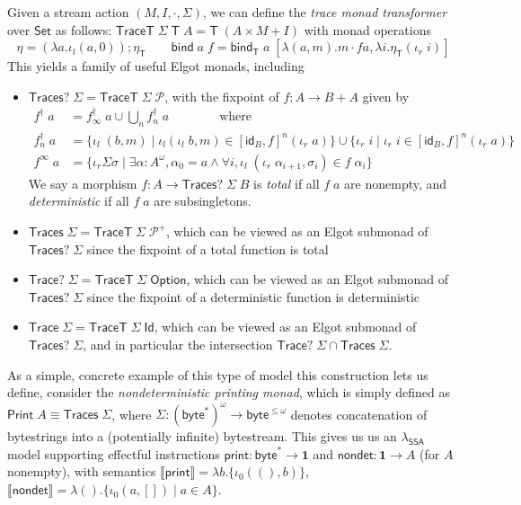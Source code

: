 \documentclass[acmsmall,screen,review]{acmart}
\newcommand{\mc}[1]{\ensuremath{\mathcal{#1}}}
\newcommand{\mb}[1]{\ensuremath{\mathbf{#1}}}
\newcommand{\ms}[1]{\ensuremath{\mathsf{#1}}}
\newcommand{\dnt}[1]{\llbracket{#1}\rrbracket}
\newcommand{\isotopessa}{\(\lambda_{\ms{SSA}}\)}
\begin{document}
\begin{definition}
  Given a stream action $(M, I, \cdot, \Sigma)$, we can define the \emph{trace monad transformer}
  over $\ms{Set}$ as follows:
  $
  \ms{TraceT}\;\Sigma\;\ms{T}\;A = \ms{T}\;(A \times M + I)
  $
  with monad operations
  $$
    \eta = (\lambda a. \iota_l (a, 0)) ; \eta_{\ms{T}} \qquad
    \ms{bind}\;a\;f 
    = \ms{bind}_{\ms{T}}\;a\;[\lambda (a, m). m \cdot f a, \lambda i. \eta_{\ms{T}}(\iota_r\;i)]
  $$
  This yields a family of useful Elgot monads, including
  \begin{itemize}
    \item $\ms{Traces}?\;\Sigma = \ms{TraceT}\;\Sigma\;\mc{P}$, with the fixpoint of 
    $f : A \to B + A$ given by
    \begin{align}
      f^\dagger\;a &= f^\dagger_\infty\;a \cup \bigcup_n f^\dagger_n\;a 
        \qquad \qquad \text{where} \\
      f^\dagger_n\;a &=
          \{\iota_l\;(b, m) \mid \iota_l(\iota_l\;b, m) \in [\ms{id}_B, f]^n(\iota_r\;a)\}
          \cup \{\iota_r\;i \mid \iota_r\;i \in [\ms{id}_B, f]^n(\iota_r\;a)\} \\
      f^\infty\;a &= \{\iota_r \Sigma \sigma \mid \exists \alpha : A^\omega, 
        \alpha_0 = a \land \forall i, \iota_l\;(\iota_r\;\alpha_{i + 1}, \sigma_i) \in f\;\alpha_i \} 
    \end{align}
    We say a morphism $f : A \to \ms{Traces}?\;\Sigma\;B$ is \emph{total} if all $f\;a$ are
    nonempty, and \emph{deterministic} if all $f\;a$ are subsingletons.
    \item $\ms{Traces}\;\Sigma = \ms{TraceT}\;\Sigma\;\mc{P}^+$, which can be viewed as an Elgot
    submonad of $\ms{Traces}?\;\Sigma$ since the fixpoint of a total function is total
    \item $\ms{Trace}?\;\Sigma = \ms{TraceT}\;\Sigma\;\ms{Option}$, which can be viewed as an Elgot
    submonad of $\ms{Traces}?\;\Sigma$ since the fixpoint of a deterministic function is
    deterministic
    \item $\ms{Trace}\;\Sigma = \ms{TraceT}\;\Sigma\;\ms{Id}$, which can be viewed as an Elgot
    submonad of $\ms{Traces}?\;\Sigma$, and in particular the intersection 
    $\ms{Trace}?\;\Sigma \cap \ms{Traces}\;\Sigma$.
  \end{itemize}
\end{definition}

As a simple, concrete example of this type of model this construction lets us define, consider the
\emph{nondeterministic printing monad}, which is simply defined as \(\ms{Print}\;A \equiv
\ms{Traces}\;\Sigma\), where \(\Sigma: (\ms{byte}^*)^\omega \to \ms{byte}^{\leq \omega}\) denotes
concatenation of bytestrings into a (potentially infinite) bytestream. This gives us us an
\isotopessa{} model supporting effectful instructions \(\ms{print}: \ms{byte}^* \to \mb{1}\) and
\(\ms{nondet}: \mb{1} \to A\) (for \(A\) nonempty), with semantics \(\dnt{\ms{print}} = \lambda
b.\{\iota_0 ((), b)\}\), \(\dnt{\ms{nondet}} = \lambda (). \{\iota_0 (a, []) \mid a \in A\}\).
\end{document}

